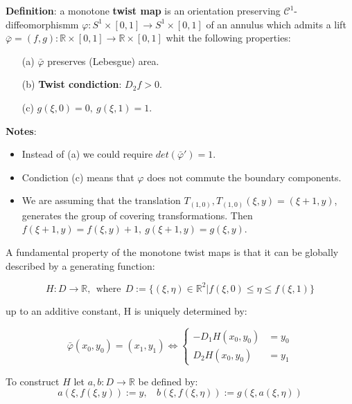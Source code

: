 \documentclass{article}
\begin{document}
\noindent \textbf{Definition}: \label{def-TwistMap} a monotone \textbf{twist map} is an orientation preserving $\mathcal{C}^{1}$-diffeomorphismm $\varphi: S^1 \times [0, 1] \longrightarrow S^{1} \times [0, 1]$ of an annulus which admits a lift $\bar{\varphi} = (f, g): \mathbb{R} \times [0, 1] \longrightarrow \mathbb{R} \times [0, 1]$ whit the following properties:
\begin{itemize}
	\item [(a)]\label{def-TwistMap_a} $\bar{\varphi}$ preserves (Lebesgue) area.
	\item [(b)]\label{def-TwistMap_b}\textbf{Twist condiction}: $D_{2} f > 0$.
	\item [(c)] \label{def-TwistMap_c}$g(\xi, 0) = 0, \ g(\xi, 1) = 1$.
\end{itemize}

\noindent \textbf{Notes}:
	\begin{itemize}
		\item Instead of (a) we could require $det( \bar{\varphi}' ) = 1$.
		\item Condiction (c) means that $\varphi$ does not commute the boundary components.
		\item We are assuming that the translation $T_{ (1, 0) }, T_{ (1, 0) } (\xi, y)  = (\xi + 1, y)$, generates the group of covering transformations. Then $f( \xi + 1, y) = f(\xi, y) + 1, \ g(\xi + 1, y) = g(\xi, y)$.
	\end{itemize}
		
		

A fundamental property of the monotone twist maps is that it can be globally described by a generating function:

$$
	H: D \rightarrow \mathbb{R}, \ \ \text{where} \ \ D := \{  (\xi, \eta) \in \mathbb{R}^{2} | f(\xi, 0) \leq \eta \leq f(\xi, 1) 
	\}
$$

up to an additive constant, H is uniquely determined by:

\begin{equation}\label{eq1}
	\bar{\varphi} (x_0, y_0) = (x_1, y_1) \Leftrightarrow
	  \begin{cases} 
     	    - D_{1} H  (x_0, y_0) &= y_0  \\
      		D_{2} H  (x_0, y_0) &= y_1 
      \end{cases}
\end{equation}

\noindent To construct $H$ let $a, b: D \rightarrow \mathbb{R}$ be defined by:
$$
	a ( \xi, f(\xi, y)) := y,  \ \ \ \	b( \xi, f(\xi, \eta)) := g(\xi, a( \xi, \eta))
$$
\end{document}
